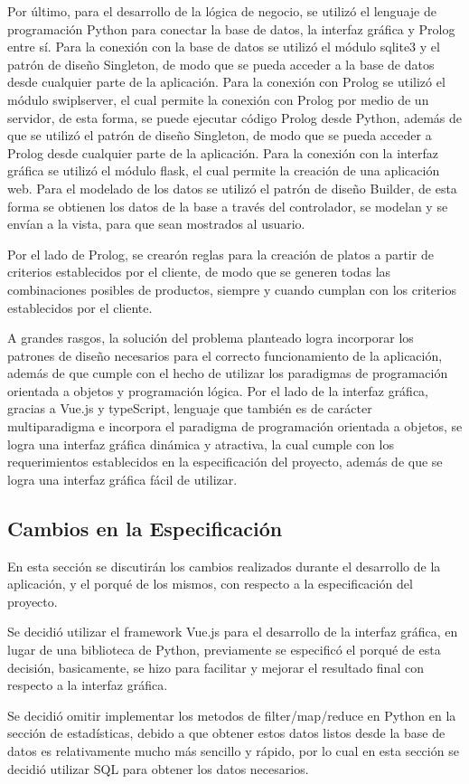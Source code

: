 Por último, para el desarrollo de la lógica de negocio, se utilizó el 
lenguaje de programación Python para conectar la base de datos, 
la interfaz gráfica y Prolog entre sí. Para la conexión con la base de 
datos se utilizó el módulo sqlite3 y el patrón de diseño Singleton, de modo 
que se pueda acceder a la base de datos desde cualquier parte de la 
aplicación. Para la conexión con Prolog se utilizó el módulo swiplserver, 
el cual permite la conexión con Prolog por medio de un servidor, de esta 
forma, se puede ejecutar código Prolog desde Python, además de que se 
utilizó el patrón de diseño Singleton, de modo que se pueda acceder a 
Prolog desde cualquier parte de la aplicación. Para la conexión con la 
interfaz gráfica se utilizó el módulo flask, el cual permite la creación 
de una aplicación web. Para el modelado de los datos se utilizó el 
patrón de diseño Builder, de esta forma se obtienen los datos de la base 
a través del controlador, se modelan y se envían a la vista, para que 
sean mostrados al usuario.

Por el lado de Prolog, se crearón reglas para la creación de platos 
a partir de criterios establecidos por el cliente, de modo que 
se generen todas las combinaciones posibles de productos, siempre y
cuando cumplan con los criterios establecidos por el cliente.

A grandes rasgos, la solución del problema planteado logra 
incorporar los patrones de diseño necesarios para el correcto 
funcionamiento de la aplicación, además de que cumple con el hecho 
de utilizar los paradigmas de programación orientada a objetos y 
programación lógica. Por el lado de la interfaz gráfica, gracias a 
Vue.js y typeScript, lenguaje que también es de carácter multiparadigma 
e incorpora el paradigma de programación orientada a objetos,
se logra una interfaz gráfica dinámica y atractiva, la cual cumple con los
requerimientos establecidos en la especificación del proyecto, además de que se
logra una interfaz gráfica fácil de utilizar.

\subsection{Cambios en la Especificación}

En esta sección se discutirán los cambios realizados durante el desarrollo
de la aplicación, y el porqué de los mismos, con respecto a la especificación
del proyecto.

Se decidió utilizar el framework Vue.js para el desarrollo de la 
interfaz gráfica, en lugar de una biblioteca de Python, previamente 
se especificó el porqué de esta decisión, basicamente, se hizo para facilitar 
y mejorar el resultado final con respecto a la interfaz gráfica.

Se decidió omitir implementar los metodos de filter/map/reduce 
en Python en la sección de estadísticas, debido a que obtener estos datos 
listos desde la base de datos es relativamente mucho más sencillo y 
rápido, por lo cual en esta sección se decidió utilizar SQL para obtener
los datos necesarios.
